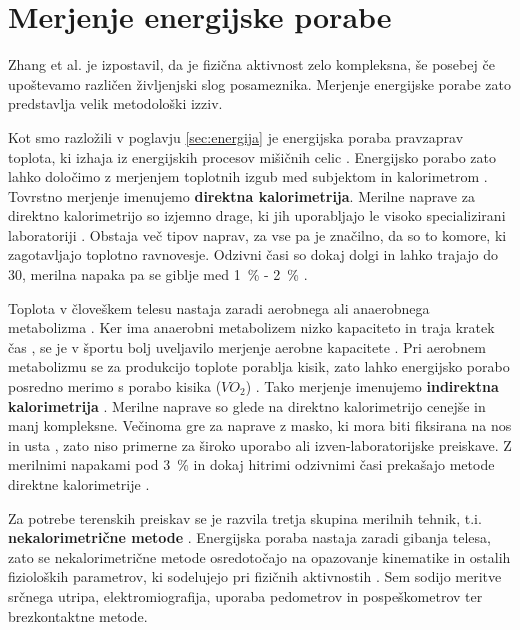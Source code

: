 \section{Merjenje energijske porabe}\label{sec:merjenje}
Zhang et al. \cite{zhang2004improving} je izpostavil, da je fizična aktivnost zelo kompleksna, še posebej če upoštevamo različen življenjski slog posameznika. Merjenje energijske porabe zato predstavlja velik metodološki izziv.

Kot smo razložili v poglavju \ref{sec:energija} je energijska poraba pravzaprav toplota, ki izhaja iz energijskih procesov mišičnih celic \cite{scott2005misconceptions}. Energijsko porabo zato lahko določimo z merjenjem toplotnih izgub med subjektom in kalorimetrom \cite{levine2005measurement}. Tovrstno merjenje imenujemo \textbf{direktna kalorimetrija}. Merilne naprave za direktno kalorimetrijo so izjemno drage, ki jih uporabljajo le visoko specializirani laboratoriji \cite{levine2005measurement}. Obstaja več tipov naprav, za vse pa je značilno, da so to komore, ki zagotavljajo toplotno ravnovesje. Odzivni časi so dokaj dolgi in lahko trajajo do \SI{30}{\min}, merilna napaka pa se giblje med \SI{1}{\%} - \SI{2}{\%} \cite{levine2005measurement}.

Toplota v človeškem telesu nastaja zaradi aerobnega ali anaerobnega metabolizma \cite{scott2005misconceptions}. Ker ima anaerobni metabolizem nizko kapaciteto in traja kratek čas \cite{sahlin1998energy}, se je v športu bolj uveljavilo merjenje aerobne kapacitete \cite{scott2005misconceptions,howley1995criteria}. Pri aerobnem metabolizmu se za produkcijo toplote porablja kisik, zato lahko energijsko porabo posredno merimo s porabo kisika (${VO}_2$) \cite{scott2005misconceptions}. Tako merjenje imenujemo \textbf{indirektna kalorimetrija} \cite{levine2005measurement}. Merilne naprave so glede na direktno kalorimetrijo cenejše in manj kompleksne. Večinoma gre za naprave z masko, ki mora biti fiksirana na nos in usta \cite{levine2005measurement}, zato niso primerne za široko uporabo ali izven-laboratorijske preiskave. Z merilnimi napakami pod \SI{3}{\%} in dokaj hitrimi odzivnimi časi prekašajo metode direktne kalorimetrije \cite{levine2005measurement}. 

Za potrebe terenskih preiskav se je razvila tretja skupina merilnih tehnik, t.i. \textbf{nekalorimetrične metode} \cite{levine2005measurement}. Energijska poraba nastaja zaradi gibanja telesa, zato se nekalorimetrične metode osredotočajo na opazovanje kinematike in ostalih fizioloških parametrov, ki sodelujejo pri fizičnih aktivnostih \cite{levine2005measurement}. Sem sodijo meritve srčnega utripa, elektromiografija, uporaba pedometrov in pospeškometrov ter brezkontaktne metode.

